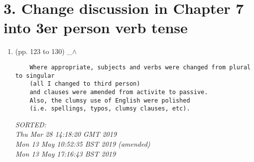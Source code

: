 \documentclass[12pt]{article}
\begin{document}
\section*{3. 
	Change discussion in Chapter 7 into 3er person verb tense
	}

\begin{enumerate}

\item  (pp. 123 to 130)  \_$\wedge$  

	\begin{verbatim}
	Where appropriate, subjects and verbs were changed from plural to singular
	(all I changed to third person)
	and clauses were amended from activite to passive.
	Also, the clumsy use of English were polished 
	(i.e. spellings, typos, clumsy clauses, etc). 
	\end{verbatim}
	\textit{
	SORTED: \\
	Thu Mar 28 14:18:20 GMT 2019 \\
	Mon 13 May 10:52:35 BST 2019 (amended) \\
	Mon 13 May 17:16:43 BST 2019
	}
	\\


%
%
%




\end{enumerate}


\end{document}
